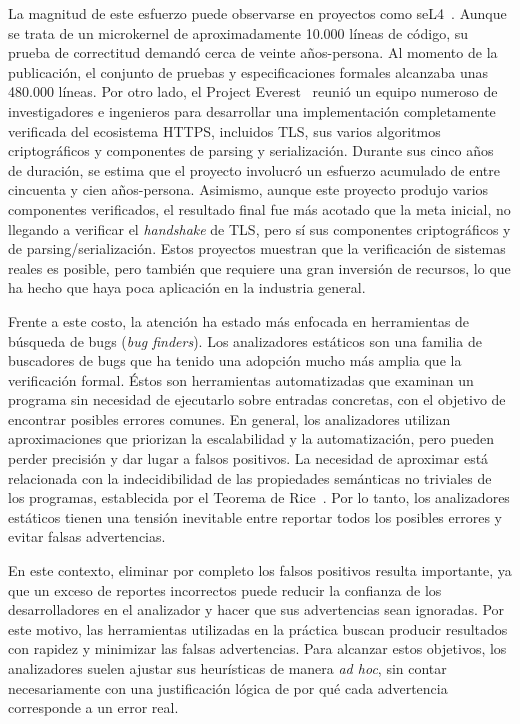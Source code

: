 \documentclass[a4paper,	11pt]{report}
\begin{document}
La magnitud de este esfuerzo puede observarse en proyectos como seL4~\citep{sel4}.
Aunque se trata de un microkernel de aproximadamente 10.000 líneas de código,
su prueba de correctitud demandó cerca de veinte años-persona.
Al momento de la publicación,
el conjunto de pruebas y especificaciones formales alcanzaba unas 480.000 líneas.
Por otro lado, el Project Everest~\citep{everest} reunió un equipo numeroso de
investigadores e ingenieros para desarrollar una implementación completamente
verificada del ecosistema HTTPS, incluidos TLS, sus varios algoritmos
criptográficos y componentes de parsing y serialización.
Durante sus cinco años de duración, se estima que el proyecto involucró un
esfuerzo acumulado de entre cincuenta y cien años-persona.
Asimismo, aunque este proyecto produjo varios componentes verificados, el
resultado final fue más acotado que la meta inicial, no llegando a verificar
el \emph{handshake} de TLS, pero sí sus componentes criptográficos y de parsing/serialización.
%
Estos proyectos muestran que la verificación de sistemas reales es posible, pero
también que requiere una gran inversión de recursos, lo que ha hecho que haya
poca aplicación en la industria general.

Frente a este costo, la atención ha estado más enfocada en herramientas
de búsqueda de bugs (\emph{bug finders}).
Los analizadores estáticos son una familia de buscadores de bugs
que ha
tenido una adopción mucho más amplia que la verificación formal.
%
Éstos son herramientas automatizadas que
examinan un
programa sin necesidad de ejecutarlo sobre entradas concretas,
con el objetivo de encontrar posibles errores comunes.
En general, los analizadores utilizan aproximaciones que priorizan la escalabilidad y la automatización,
pero pueden perder precisión y dar lugar a falsos positivos.
La necesidad de aproximar está relacionada con la indecidibilidad de las propiedades semánticas no triviales de los programas,
establecida por el Teorema de Rice~\citep{riceteo}.
Por lo tanto, los analizadores estáticos tienen una tensión inevitable
entre reportar todos los posibles errores y evitar falsas advertencias.

En este contexto, eliminar por completo los falsos positivos resulta importante,
ya que un exceso de reportes incorrectos puede reducir la confianza de los desarrolladores en el analizador
y hacer que sus advertencias sean ignoradas.
Por este motivo,
las herramientas utilizadas en la práctica
buscan producir resultados con rapidez y
minimizar las falsas advertencias.
Para alcanzar estos objetivos, los analizadores suelen ajustar sus heurísticas de manera \emph{ad hoc},
sin contar necesariamente con una justificación lógica de por qué cada advertencia corresponde a un error real.
\end{document}
